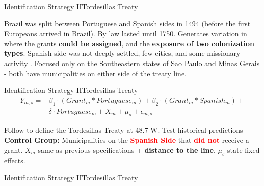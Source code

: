 \documentclass[aspectratio=1610]{beamer}
\begin{document}
\begin{frame}{Identification Strategy II}{Tordesillas Treaty}
    \begin{outline}
        \1 Brazil was split between Portuguese and Spanish sides in 1494 (before the first Europeans arrived in Brazil).
        \vspace{2mm}
        \1 By law lasted until 1750.
        \vspace{2mm}
        \1 Generates variation in where the grants \textbf{could be assigned}, and the \textbf{exposure of two colonization types}.
        \vspace{2mm}   
            \2 Spanish side was not deeply settled, few cities, and some missionary activity \parencite{Barsanetti2021-hp}.
        \vspace{2mm}   
        \1 Focused only on the Southeastern states of Sao Paulo and Minas Gerais - both have municipalities on either side of the treaty line.
    \end{outline}
\end{frame}

\begin{frame}[t]{Identification Strategy II}{Tordesillas Treaty}
    \begin{equation*}
        \begin{split}
        Y_{m,s} = & \beta_1 \cdot (Grant_m  * Portuguese_m) + \beta_2 \cdot (Grant_m * Spanish_m) + \\
        & \delta \cdot  Portuguese_m + X_{m} + \mu_s + \epsilon_{m,s}
        \end{split}
    \end{equation*}
    \begin{outline}
        \1 Follow \textcite{Laudares2022-vy} to define the Tordesillas Treaty at 48.7 W. 
        \vspace{2mm}
        \1 Test historical predictions
        \vspace{2mm}
        \1 \textbf{Control Group:} Municipalities on the \textcolor{red}{\textbf{Spanish Side}} that \textcolor{red}{\textbf{did not}} receive a grant.
        \vspace{2mm}
            \2 $X_m$ same as previous specifications + \textbf{distance to the line}.
        \vspace{2mm}
            \2 $\mu_s$ state fixed effects.
    \end{outline}
\end{frame}

\begin{frame}{Identification Strategy II}{Tordesillas Treaty}
    \begin{figure}[h!]
        \begin{center}
        \end{center}
      \end{figure}
\end{frame}
\end{document}
